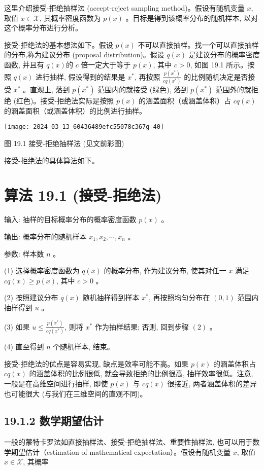 \documentclass[10pt]{article}
\begin{document}
这里介绍接受-拒绝抽样法 (accept-reject sampling method)。假设有随机变量 $x$, 取值 $x \in \mathcal{X}$, 其概率密度函数为 $p(x)$ 。目标是得到该概率分布的随机样本, 以对这个概率分布进行分析。

接受-拒绝法的基本想法如下。假设 $p(x)$ 不可以直接抽样。找一个可以直接抽样的分布,称为建议分布 (proposal distribution)。假设 $q(x)$ 是建议分布的概率密度函数, 并且有 $q(x)$的 $c$ 倍一定大于等于 $p(x)$, 其中 $c>0$, 如图 19.1 所示。按照 $q(x)$ 进行抽样, 假设得到的结果是 $x^{*}$, 再按照 $\frac{p\left(x^{*}\right)}{c q\left(x^{*}\right)}$ 的比例随机决定是否接受 $x^{*}$ 。直观上, 落到 $p\left(x^{*}\right)$ 范围内的就接受 (绿色), 落到 $p\left(x^{*}\right)$ 范围外的就拒绝 (红色)。接受-拒绝法实际是按照 $p(x)$ 的涵盖面积（或涵盖体积）占 $c q(x)$ 的涵盖面积（或涵盖体积）的比例进行抽样。

\begin{center}
\texttt{[image: 2024\_03\_13\_60436489efc55078c367g-40]}
\end{center}

图 19.1 接受-拒绝抽样法 (见文前彩图)

接受-拒绝法的具体算法如下。

\section*{算法 19.1 (接受-拒绝法)}
输入: 抽样的目标概率分布的概率密度函数 $p(x)$ 。

输出: 概率分布的随机样本 $x_{1}, x_{2}, \cdots, x_{n}$ 。

参数: 样本数 $n$ 。

(1) 选择概率密度函数为 $q(x)$ 的概率分布, 作为建议分布, 使其对任一 $x$ 满足 $c q(x) \geqslant p(x)$, 其中 $c>0$ 。

(2) 按照建议分布 $q(x)$ 随机抽样得到样本 $x^{*}$, 再按照均匀分布在 $(0,1)$ 范围内抽样得到 $u$ 。

(3) 如果 $u \leqslant \frac{p\left(x^{*}\right)}{c q\left(x^{*}\right)}$, 则将 $x^{*}$ 作为抽样结果; 否则, 回到步骤 $(2)$ 。

(4) 直至得到 $n$ 个随机样本, 结束。

接受-拒绝法的优点是容易实现, 缺点是效率可能不高。如果 $p(x)$ 的涵盖体积占 $c q(x)$ 的涵盖体积的比例很低, 就会导致拒绝的比例很高, 抽样效率很低。注意, 一般是在高维空间进行抽样, 即使 $p(x)$ 与 $c q(x)$ 很接近, 两者涵盖体积的差异也可能很大 (与我们在三维空间的直观不同)。

\subsection*{19.1.2 数学期望估计}
一般的蒙特卡罗法如直接抽样法、接受-拒绝抽样法、重要性抽样法, 也可以用于数学期望估计（estimation of mathematical expectation）。假设有随机变量 $x$, 取值 $x \in \mathcal{X}$, 其概率
\end{document}
